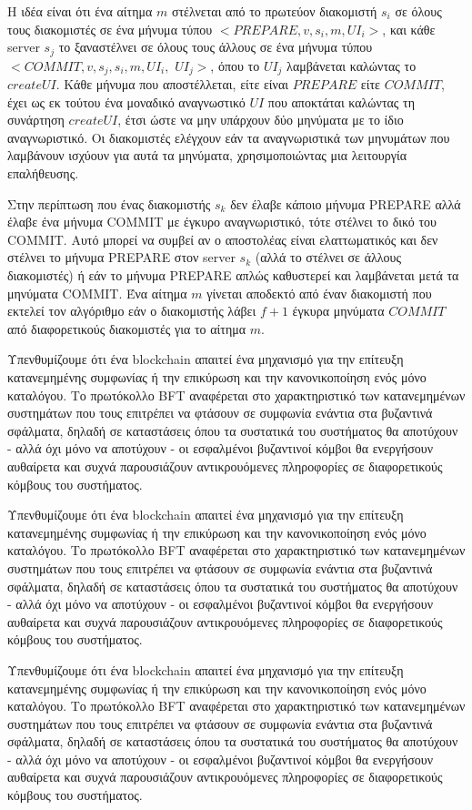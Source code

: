 Η ιδέα είναι ότι ένα αίτημα $m$ στέλνεται από το πρωτεύον διακομιστή $s_{i}$ σε όλους τους διακομιστές σε ένα μήνυμα τύπου $<PREPARE, v, s_{i}, m, UI_{i}>$, και κάθε server $s_{j}$ το ξαναστέλνει σε όλους τους άλλους σε ένα μήνυμα τύπου $<COMMIT, v, s_{j}, s_{i},m, UI_{i},$ $UI_{j}>$, όπου το $UI_{j}$ λαμβάνεται καλώντας το $createUI$. Κάθε μήνυμα που αποστέλλεται, είτε είναι $PREPARE$ είτε $COMMIT$, έχει ως εκ τούτου ένα μοναδικό αναγνωστικό $UI$ που αποκτάται καλώντας τη συνάρτηση $createUI$, έτσι ώστε να μην υπάρχουν δύο μηνύματα με το ίδιο αναγνωριστικό. Οι διακομιστές ελέγχουν εάν τα αναγνωριστικά των μηνυμάτων που λαμβάνουν ισχύουν για αυτά τα μηνύματα, χρησιμοποιώντας μια λειτουργία επαλήθευσης.

Στην περίπτωση που ένας διακομιστής $s_{k}$ δεν έλαβε κάποιο μήνυμα PREPARE αλλά έλαβε ένα μήνυμα COMMIT με έγκυρο αναγνωριστικό, τότε στέλνει το δικό του COMMIT. Αυτό μπορεί να συμβεί αν ο αποστολέας είναι ελαττωματικός και δεν στέλνει το μήνυμα PREPARE στον server $s_{k}$ (αλλά το στέλνει σε άλλους διακομιστές) ή εάν το μήνυμα PREPARE απλώς καθυστερεί και λαμβάνεται μετά τα μηνύματα COMMIT. Ένα αίτημα $m$ γίνεται αποδεκτό από έναν διακομιστή που εκτελεί τον αλγόριθμο εάν ο διακομιστής λάβει $f + 1$ έγκυρα μηνύματα $COMMIT$ από διαφορετικούς διακομιστές για το αίτημα $m$.

Υπενθυμίζουμε ότι ένα blockchain απαιτεί ένα μηχανισμό για την επίτευξη κατανεμημένης συμφωνίας ή την επικύρωση και την κανονικοποίηση ενός μόνο καταλόγου. Το πρωτόκολλο BFT αναφέρεται στο χαρακτηριστικό των κατανεμημένων συστημάτων που τους επιτρέπει να φτάσουν σε συμφωνία ενάντια στα βυζαντινά σφάλματα, δηλαδή σε καταστάσεις όπου τα συστατικά του συστήματος θα αποτύχουν - αλλά όχι μόνο να αποτύχουν - οι εσφαλμένοι βυζαντινοί κόμβοι θα ενεργήσουν αυθαίρετα και συχνά παρουσιάζουν αντικρουόμενες πληροφορίες σε διαφορετικούς κόμβους του συστήματος.

Υπενθυμίζουμε ότι ένα blockchain απαιτεί ένα μηχανισμό για την επίτευξη κατανεμημένης συμφωνίας ή την επικύρωση και την κανονικοποίηση ενός μόνο καταλόγου. Το πρωτόκολλο BFT αναφέρεται στο χαρακτηριστικό των κατανεμημένων συστημάτων που τους επιτρέπει να φτάσουν σε συμφωνία ενάντια στα βυζαντινά σφάλματα, δηλαδή σε καταστάσεις όπου τα συστατικά του συστήματος θα αποτύχουν - αλλά όχι μόνο να αποτύχουν - οι εσφαλμένοι βυζαντινοί κόμβοι θα ενεργήσουν αυθαίρετα και συχνά παρουσιάζουν αντικρουόμενες πληροφορίες σε διαφορετικούς κόμβους του συστήματος.

Υπενθυμίζουμε ότι ένα blockchain απαιτεί ένα μηχανισμό για την επίτευξη κατανεμημένης συμφωνίας ή την επικύρωση και την κανονικοποίηση ενός μόνο καταλόγου. Το πρωτόκολλο BFT αναφέρεται στο χαρακτηριστικό των κατανεμημένων συστημάτων που τους επιτρέπει να φτάσουν σε συμφωνία ενάντια στα βυζαντινά σφάλματα, δηλαδή σε καταστάσεις όπου τα συστατικά του συστήματος θα αποτύχουν - αλλά όχι μόνο να αποτύχουν - οι εσφαλμένοι βυζαντινοί κόμβοι θα ενεργήσουν αυθαίρετα και συχνά παρουσιάζουν αντικρουόμενες πληροφορίες σε διαφορετικούς κόμβους του συστήματος.

